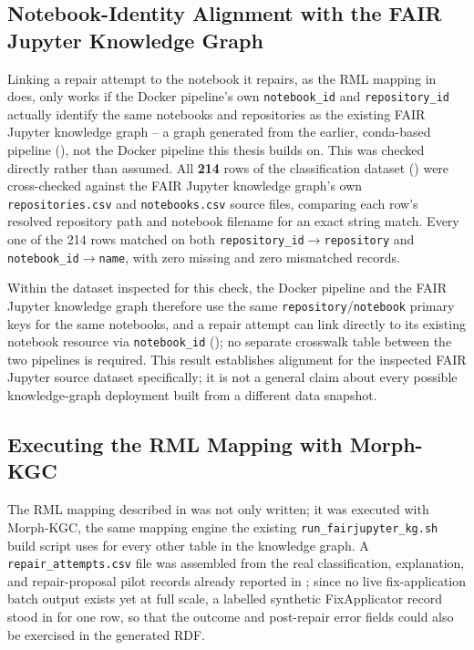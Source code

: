 \subsection{Notebook-Identity Alignment with the FAIR Jupyter Knowledge Graph}
\label{sec:v-i6-alignment}

Linking a repair attempt to the notebook it repairs, as the RML mapping in
 does, only works if the Docker pipeline's own
\texttt{notebook\_id} and \texttt{repository\_id} actually identify the same
notebooks and repositories as the existing FAIR Jupyter knowledge graph -- a
graph generated from the earlier, conda-based pipeline
(), not the Docker pipeline this thesis builds on.
This was checked directly rather than assumed. All \textbf{214} rows of the
classification dataset () were cross-checked
against the FAIR Jupyter knowledge graph's own \texttt{repositories.csv} and
\texttt{notebooks.csv} source files, comparing each row's resolved
repository path and notebook filename for an exact string match. Every one
of the 214 rows matched on both \texttt{repository\_id}$\to$\texttt{repository}
and \texttt{notebook\_id}$\to$\texttt{name}, with zero missing and zero
mismatched records.

Within the dataset inspected for this check, the Docker pipeline and the
FAIR Jupyter knowledge graph therefore use the same
\texttt{repository}/\texttt{notebook} primary keys for the same notebooks,
and a repair attempt can link directly to its existing notebook resource via
\texttt{notebook\_id} (); no separate
crosswalk table between the two pipelines is required. This result
establishes alignment for the inspected FAIR Jupyter source dataset
specifically; it is not a general claim about every possible knowledge-graph
deployment built from a different data snapshot.

\subsection{Executing the RML Mapping with Morph-KGC}
\label{sec:v-i6-morphkgc}

The RML mapping described in  was not only
written; it was executed with Morph-KGC, the same mapping engine the
existing \texttt{run\_fairjupyter\_kg.sh} build script uses for every other
table in the knowledge graph. A \texttt{repair\_attempts.csv} file was
assembled from the real classification, explanation, and repair-proposal
pilot records already reported in ; since no live
fix-application batch output exists yet at full scale, a labelled synthetic
FixApplicator record stood in for one row, so that the outcome and
post-repair error fields could also be exercised in the generated RDF.

